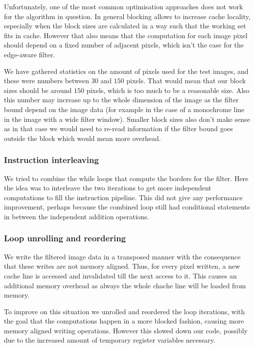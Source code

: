 Unfortunately, one of the most common optimisation approaches does not work for the algorithm in question. In general blocking allows to increase cache locality, especially when the block sizes are calculated in a way such that the working set fits in cache. However that also means that the computation for each image pixel should depend on a fixed number of adjacent pixels, which isn't the case for the edge-aware filter.

We have gathered statistics on the amount of pixels used for the test images, and these were numbers between $30$ and $150$ pixels. That would mean that our block sizes should be around $150$ pixels, which is too much to be a reasonable size. Also this number may increase up to the whole dimension of the image as the filter bound depend on the image data (for example in the case of a monochrome line in the image with a wide filter window). Smaller block sizes also don't make sense as in that case we would need to re-read information if the filter bound goes outside the block which would mean more overhead.

\subsubsection{Instruction interleaving}

We tried to combine the while loops that compute the borders for the filter. Here the idea was to interleave the two iterations to get more independent computations to fill the instruction pipeline. This did not give any performance improvement, perhaps because the combined loop still had conditional statements in between the independent addition operations.

\subsubsection{Loop unrolling and reordering}

We write the filtered image data in a transposed manner with the consequence that these writes are not memory aligned. Thus, for every pixel written, a new cache line is accessed and invalidated till the next access to it. This causes an additional memory overhead as always the whole chache line will be loaded from memory.

To improve on this situation we unrolled and reordered the loop iterations, with the goal that the computations happen in a more blocked fashion, causing more memory aligned writing operations. However this slowed down our code, possibly due to the increased amount of temporary register variables necessary.

